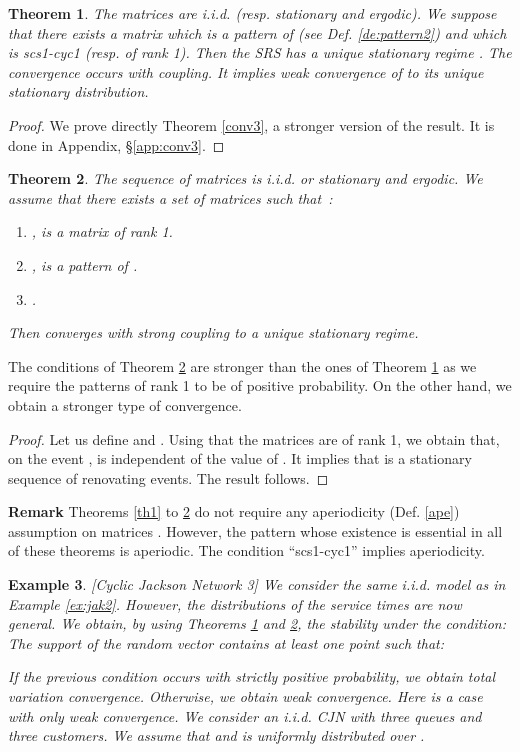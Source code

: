 \documentclass[11pt,titlepage]{article}
\newtheorem{theo}{Theorem }[section]
\newtheorem{example}[theo]{Example }
\newenvironment{exam}{\begin{example}\rm}{\end{example}}
\begin{document}
\begin{theo}
\label{th3}
The matrices  are i.i.d. (resp. stationary and ergodic). 
We suppose that
there exists a 
matrix  which is a pattern of 
 (see Def. \ref{de:pattern2}) and which is
scs1-cyc1 (resp. of rank 1).
Then the SRS  has a unique stationary regime .  The convergence occurs with coupling. It 
implies weak convergence of  to its unique 
stationary distribution.
\end{theo}
\begin{proof}
We prove directly Theorem
\ref{conv3}, a stronger version of the result. 
It is done in Appendix, \S \ref{app:conv3}. 
\end{proof}

\begin{theo}
The sequence of matrices  is  i.i.d. or stationary and ergodic.
We assume that
there exists a set  of matrices such that~:
\begin{enumerate}
\item ,  is a matrix of rank 1.
\item ,  is a pattern of .
\item .
\end{enumerate}
Then  converges with strong coupling to a unique stationary
regime. 
\label{th4}
\end{theo}
The conditions of Theorem \ref{th4} are stronger than the ones of 
Theorem \ref{th3} as we require the patterns of rank 1 to be of
positive probability. On the other hand, we obtain a stronger type of 
convergence.
\begin{proof}
Let us define
 and . Using that the matrices  are of rank 1, we
obtain that, on the event ,  is 
independent of the value of . It implies that 
 is a stationary sequence of renovating events. 
The result follows. 
\end{proof}


{\bf Remark } Theorems \ref{th1} to \ref{th4} do not require any aperiodicity
(Def. 
\ref{ape}) assumption on matrices . 
However, the pattern  whose existence is essential in all of these theorems
is 
aperiodic. The condition ``scs1-cyc1'' implies 
aperiodicity.  

\begin{exam}[Cyclic Jackson Network 3]
\label{ex:jak3}
We consider the same i.i.d. model as in Example \ref{ex:jak2}. 
However, the
distributions of the service times are now general. 
We obtain, by using Theorems
\ref{th3} and \ref{th4}, the stability under the condition:\\
The support of the random vector  contains at least one point such that:

If the previous condition occurs with strictly positive probability,
we obtain total variation convergence. Otherwise, we obtain weak 
convergence. 
Here  is a case with only weak convergence. We consider an i.i.d. CJN
with three queues and three customers. We assume that  and  is uniformly distributed over . 
\end{exam}
\end{document}
